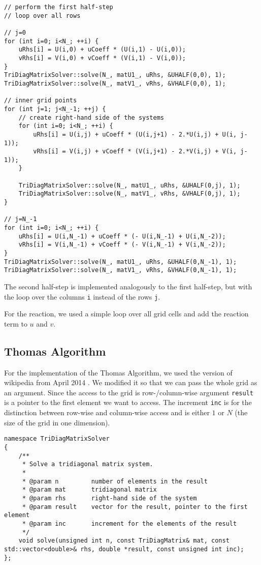\documentclass[a4paper]{article}
\begin{document}
\begin{lstlisting}[label={lst:adi-serial}, caption={Serial implementation of the first half-step}]
// perform the first half-step
// loop over all rows

// j=0
for (int i=0; i<N_; ++i) {
    uRhs[i] = U(i,0) + uCoeff * (U(i,1) - U(i,0));
    vRhs[i] = V(i,0) + vCoeff * (V(i,1) - V(i,0));
}
TriDiagMatrixSolver::solve(N_, matU1_, uRhs, &UHALF(0,0), 1);
TriDiagMatrixSolver::solve(N_, matV1_, vRhs, &VHALF(0,0), 1);

// inner grid points
for (int j=1; j<N_-1; ++j) {
    // create right-hand side of the systems
    for (int i=0; i<N_; ++i) {
        uRhs[i] = U(i,j) + uCoeff * (U(i,j+1) - 2.*U(i,j) + U(i, j-1));
        vRhs[i] = V(i,j) + vCoeff * (V(i,j+1) - 2.*V(i,j) + V(i, j-1));
    }
    
    TriDiagMatrixSolver::solve(N_, matU1_, uRhs, &UHALF(0,j), 1);
    TriDiagMatrixSolver::solve(N_, matV1_, vRhs, &VHALF(0,j), 1);
}

// j=N_-1
for (int i=0; i<N_; ++i) {
    uRhs[i] = U(i,N_-1) + uCoeff * (- U(i,N_-1) + U(i,N_-2));
    vRhs[i] = V(i,N_-1) + vCoeff * (- V(i,N_-1) + V(i,N_-2));
}
TriDiagMatrixSolver::solve(N_, matU1_, uRhs, &UHALF(0,N_-1), 1);
TriDiagMatrixSolver::solve(N_, matV1_, vRhs, &VHALF(0,N_-1), 1);
\end{lstlisting}

The second half-step is implemented analogously to the first half-step, but with the loop over the columns \verb+i+ instead of the rows \verb+j+.

For the reaction, we used a simple loop over all grid cells and add the reaction term to $u$ and $v$.



\subsection{Thomas Algorithm}\label{sec:thomas}
For the implementation of the Thomas Algorithm, we used the version of wikipedia from April 2014 \cite{wiki:thomas-alg}.
We modified it so that we can pass the whole grid as an argument.
Since the access to the grid is row-/column-wise argument \verb+result+ is a pointer to the first element we want to access.
The increment \verb+inc+ is for the distinction between row-wise and column-wise access and is either $1$ or $N$ (the size of the grid in one dimension).

\begin{lstlisting}[label={lst:thomas-dec}, caption={Declaration of our implementation of the Thomas algorithm}]
namespace TriDiagMatrixSolver
{
    /**
     * Solve a tridiagonal matrix system.
     * 
     * @param n         number of elements in the result
     * @param mat       tridiagonal matrix
     * @param rhs       right-hand side of the system
     * @param result    vector for the result, pointer to the first element
     * @param inc       increment for the elements of the result
     */
    void solve(unsigned int n, const TriDiagMatrix& mat, const std::vector<double>& rhs, double *result, const unsigned int inc);
};
\end{lstlisting}




\clearpage


\end{document}
